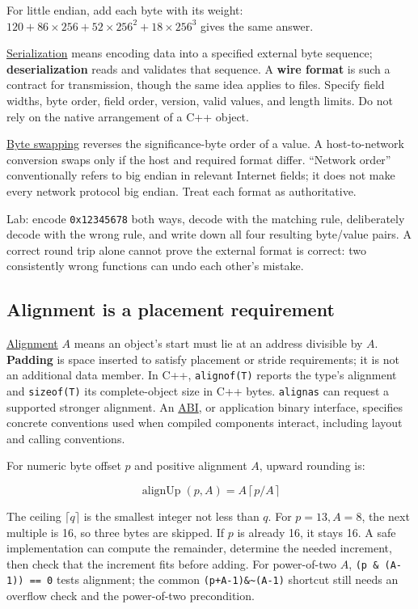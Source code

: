 For little endian, add each byte with its weight: \(120+86\times256+52\times256^2+18\times256^3\) gives the same answer.

\hyperref[appendix-91d09ebed979]{Serialization} means encoding data into a specified external byte sequence; \textbf{deserialization} reads and validates that sequence. A \textbf{wire format} is such a contract for transmission, though the same idea applies to files. Specify field widths, byte order, field order, version, valid values, and length limits. Do not rely on the native arrangement of a C++ object.

\hyperref[appendix-11ba36693aa2]{Byte swapping} reverses the significance-byte order of a value. A host-to-network conversion swaps only if the host and required format differ. ``Network order'' conventionally refers to big endian in relevant Internet fields; it does not make every network protocol big endian. Treat each format as authoritative.

Lab: encode \texttt{0x12345678} both ways, decode with the matching rule, deliberately decode with the wrong rule, and write down all four resulting byte/value pairs. A correct round trip alone cannot prove the external format is correct: two consistently wrong functions can undo each other's mistake.

\subsection{Alignment is a placement requirement}\label{05-engine-i-ch002-alignment-is-a-placement-requirement}

\hyperref[appendix-a1f7c53b4742]{Alignment} \(A\) means an object's start must lie at an address divisible by \(A\). \textbf{Padding} is space inserted to satisfy placement or stride requirements; it is not an additional data member. In C++, \texttt{alignof(T)} reports the type's alignment and \texttt{sizeof(T)} its complete-object size in C++ bytes. \texttt{alignas} can request a supported stronger alignment. An \hyperref[appendix-c4ac6bb0fff8]{ABI}, or application binary interface, specifies concrete conventions used when compiled components interact, including layout and calling conventions.

For numeric byte offset \(p\) and positive alignment \(A\), upward rounding is:

\[
\operatorname{alignUp}(p,A)=A\left\lceil p/A\right\rceil
\]

The ceiling \(\lceil q\rceil\) is the smallest integer not less than \(q\). For \(p=13,A=8\), the next multiple is 16, so three bytes are skipped. If \(p\) is already 16, it stays 16. A safe implementation can compute the remainder, determine the needed increment, then check that the increment fits before adding. For power-of-two \(A\), \texttt{(p\ \&\ (A-1))\ ==\ 0} tests alignment; the common \texttt{(p+A-1)\&\textasciitilde{}(A-1)} shortcut still needs an overflow check and the power-of-two precondition.

